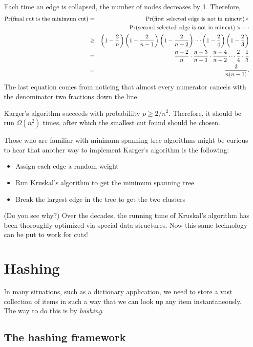 Each time an edge is collapsed, the number of nodes decreases by 1. Therefore,
\begin{eqnarray*}
\mbox{\rm Pr}(\mbox{final cut is the minimum cut})
& = &
\mbox{\rm Pr}(\mbox{first selected edge is not in mincut}) \times \\
& & \mbox{\rm Pr}(\mbox{second selected edge is not in mincut}) \times \cdots \\
& \geq & 
\left( 1 - \frac{2}{n} \right) \left( 1 - \frac{2}{n-1} \right) 
\left( 1 - \frac{2}{n-2} \right) \cdots \left( 1 - \frac{2}{4} \right) 
\left( 1 - \frac{2}{3} \right) \\
& = & 
\frac{n-2}{n} \cdot \frac{n-3}{n-1} \cdot \frac{n-4}{n-2} \cdots \frac{2}{4} \cdot 
\frac{1}{3} \\
& = & 
\frac{2}{n(n-1)} .
\end{eqnarray*}
The last equation comes from noticing that almost every numerator cancels with the 
denominator two fractions down the line.

Karger's algorithm succeeds with probabililty $p \geq 2/n^2$. Therefore,
it should be run $\Omega(n^2)$ times, after which the smallest cut found should
be chosen.

Those who are familiar with minimum spanning tree algorithms might be curious to
hear that another way to implement Karger's algorithm is the following:
\begin{itemize}
\item Assign each edge a random weight
\item Run Kruskal's algorithm to get the minimum spanning tree
\item Break the largest edge in the tree to get the two clusters
\end{itemize}
(Do you see why?) Over the decades, the running time of Kruskal's algorithm has 
been thoroughly optimized via special data structures. Now this same technology 
can be put to work for cuts!

\section{Hashing}

In many situations, such as a dictionary application, we need to store a vast 
collection of items in such a way that we can look up any item instantaneously. 
The way to do this is by {\it hashing}.

\subsection{The hashing framework}

